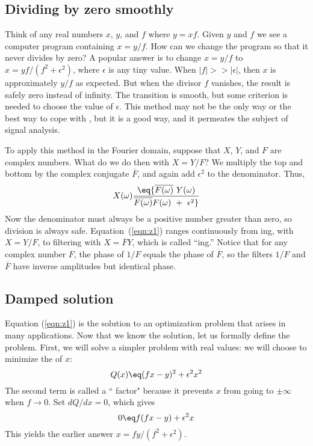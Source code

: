 \subsection{Dividing by zero smoothly}
Think of any real numbers $x$, $y$, and $f$ where $y=xf$.
Given $y$ and $f$ we see a computer program containing $x=y/f$.
How can we change the program so that it never divides by zero?
A popular answer is to change $x=y/f$
to $x=yf/(f^2+\epsilon^2)$, where $\epsilon$ is any tiny value.
When $|f| >> |\epsilon|$,
then $x$ is approximately $y/f$ as expected.
But when the divisor $f$ vanishes,
the result is safely zero instead of infinity.
The transition is smooth,
but some criterion is needed to choose the value of $\epsilon$.
This method may not be the only way or the best way
to cope with
,
but it is a good way,
and it permeates the subject of signal analysis.

\par
To apply this method in the Fourier domain,
suppose that $X$, $Y$, and $F$ are complex numbers.
What do we do then with $X=Y/F$?
We multiply the
top and bottom by the complex conjugate $\overline{F}$,
and again add $\epsilon^2$ to the denominator.
Thus,
\begin{equation}
X(\omega) \eq
{ \overline{F(\omega)} \ Y(\omega)  \over 
\overline{F(\omega)} F(\omega) \ +\ \epsilon^2}
\label{eqn:z1}
\end{equation}
Now the denominator must always be a positive number greater than zero,
so division is always safe.
Equation~(\ref{eqn:z1}) ranges continuously from
ing, with
$X=Y/F$, to filtering with $X=\overline{F}Y$,
which is called ``ing.''
Notice that for any complex number $F$,
the phase of $1/F$ equals the phase of $\overline{F}$,
so the filters $1/F$ and $\overline{F}$
have inverse amplitudes but identical phase.

\subsection{Damped solution}
Equation (\ref{eqn:z1}) is the solution to an optimization problem
that arises in many applications.
Now that we know the solution, let us formally define the problem.
First, we will solve a simpler problem with real values:
we will choose to minimize the  of $x$:
\begin{equation}
Q(x) \eq (f x-y)^2 + \epsilon^2 x^2
\label{eqn:z2}
\end{equation}
The second term is called a `` factor"
because it prevents $x$ from going to $\pm \infty$ when $f\rightarrow 0$.
Set $dQ/dx=0$, which gives
\begin{equation}
0 \eq f(f x-y) + \epsilon^2 x
\label{eqn:z3}
\end{equation}
This yields the earlier answer $x=fy/(f^2+\epsilon^2)$.

